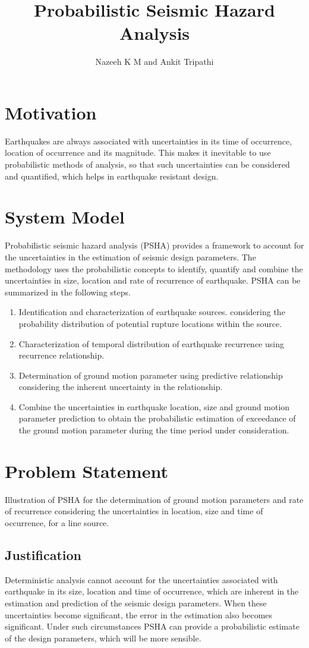 \documentclass[a4paper,english,12pt]{article}
\title{\textbf{Probabilistic Seismic Hazard Analysis}}
\author{Nazeeh K M and Ankit Tripathi}
\begin{document}
\maketitle

\section{Motivation}
Earthquakes are always associated with uncertainties in its time of occurrence, location of occurrence and its magnitude. This makes it inevitable to use probabilistic methods of analysis, so that such uncertainties can be considered and quantified, which helps in earthquake resistant design.
\section{System Model}
Probabilistic seismic hazard analysis (PSHA) provides a framework to account for the uncertainties in the estimation of seismic design parameters. The methodology uses the probabilistic concepts to identify, quantify and combine the uncertainties in size, location and rate of recurrence of earthquake. PSHA can be summarized in the following steps.
\begin{enumerate}
\item Identification and characterization of earthquake sources. considering the probability distribution of potential rupture locations within the source.
\item Characterization of temporal distribution of earthquake recurrence using recurrence relationship.
\item Determination of ground motion parameter using predictive relationship considering the inherent uncertainty in the relationship.
\item Combine the uncertainties in earthquake location, size and ground motion parameter prediction to obtain the probabilistic estimation of exceedance of the ground motion parameter during the time period under consideration.
\end{enumerate}
\section{Problem Statement}
Illustration of PSHA for the determination of ground motion parameters and rate of recurrence considering the uncertainties in location, size and time of occurrence, for a line source.
\subsection{Justification}
Deterministic analysis cannot account for the uncertainties associated with earthquake in its size, location and time of occurrence, which are inherent in the estimation and prediction of the seismic design parameters. When these uncertainties become significant, the error in the estimation also becomes significant. Under such circumstances PSHA can provide a probabilistic estimate of the design parameters, which will be more sensible.
\end{document}
